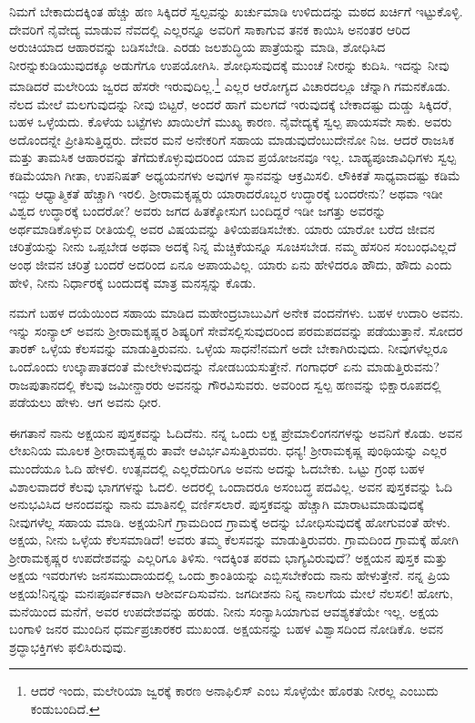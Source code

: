 ನಿಮಗೆ ಬೇಕಾದುದಕ್ಕಿಂತ ಹೆಚ್ಚು ಹಣ ಸಿಕ್ಕಿದರೆ ಸ್ವಲ್ಪವನ್ನು ಖರ್ಚುಮಾಡಿ ಉಳಿದುದನ್ನು ಮಠದ ಖರ್ಚಿಗೆ ಇಟ್ಟುಕೊಳ್ಳಿ. ದೇವರಿಗೆ ನೈವೇದ್ಯ ಮಾಡುವ ನೆವದಲ್ಲಿ ಎಲ್ಲರನ್ನೂ ಅವರಿಗೆ ಸಾಕಾಗುವ ತನಕ ಕಾಯಿಸಿ ಅನಂತರ ಆರಿದ ಅರುಚಿಯಾದ ಆಹಾರವನ್ನು ಬಡಿಸಬೇಡಿ. ಎರಡು ಜಲಶುದ್ಧಿಯ ಪಾತ್ರೆಯನ್ನು ಮಾಡಿ, ಶೋಧಿಸಿದ ನೀರನ್ನು\break ಕುಡಿಯುವುದಕ್ಕೂ ಅಡುಗೆಗೂ ಉಪಯೋಗಿಸಿ. ಶೋಧಿಸುವುದಕ್ಕೆ ಮುಂಚೆ ನೀರನ್ನು ಕುದಿಸಿ. ಇದನ್ನು ನೀವು ಮಾಡಿದರೆ ಮಲೇರಿಯ ಜ್ವರದ ಹೆಸರೇ ಇರುವುದಿಲ್ಲ.\footnote{ಆದರೆ ಇಂದು, ಮಲೇರಿಯಾ ಜ್ವರಕ್ಕೆ ಕಾರಣ ಅನಾಫಿಲಿಸ್ ಎಂಬ ಸೊಳ್ಳೆಯೇ ಹೊರತು ನೀರಲ್ಲ ಎಂಬುದು ಕಂಡುಬಂದಿದೆ.} ಎಲ್ಲರ ಆರೋಗ್ಯದ ವಿಚಾರದಲ್ಲೂ ಚೆನ್ನಾಗಿ ಗಮನಕೊಡು. ನೆಲದ ಮೇಲೆ ಮಲಗುವುದನ್ನು ನೀವು ಬಿಟ್ಟರೆ, ಅಂದರೆ ಹಾಗೆ ಮಲಗದೆ ಇರುವುದಕ್ಕೆ ಬೇಕಾದಷ್ಟು ದುಡ್ಡು ಸಿಕ್ಕಿದರೆ, ಬಹಳ ಒಳ್ಳೆಯದು. ಕೊಳೆಯ ಬಟ್ಟೆಗಳು ಖಾಯಿಲೆಗೆ ಮುಖ್ಯ ಕಾರಣ. ನೈವೇದ್ಯಕ್ಕೆ ಸ್ವಲ್ಪ ಪಾಯಸವೇ ಸಾಕು. ಅವರು ಅದೊಂದನ್ನೇ ಪ್ರೀತಿಸುತ್ತಿದ್ದರು. ದೇವರ ಮನೆ ಅನೇಕರಿಗೆ ಸಹಾಯ ಮಾಡುವುದೆಂಬುದೇನೋ ನಿಜ. ಆದರೆ ರಾಜಸಿಕ ಮತ್ತು ತಾಮಸಿಕ ಆಹಾರವನ್ನು ತೆಗೆದುಕೊಳ್ಳುವುದರಿಂದ ಯಾವ ಪ್ರಯೋಜನವೂ ಇಲ್ಲ. ಬಾಹ್ಯಪೂಜಾವಿಧಿಗಳು ಸ್ವಲ್ಪ ಕಡಿಮೆಯಾಗಿ ಗೀತಾ, ಉಪನಿಷತ್ ಅಧ್ಯಯನಗಳು ಅವುಗಳ ಸ್ಥಾನವನ್ನು ಆಕ್ರಮಿಸಲಿ. ಲೌಕಿಕತೆ ಸಾಧ್ಯವಾದಷ್ಟು ಕಡಿಮೆ ಇದ್ದು ಆಧ್ಯಾತ್ಮಿಕತೆ ಹೆಚ್ಚಾಗಿ ಇರಲಿ. ಶ‍್ರೀರಾಮಕೃಷ್ಣರು ಯಾರಾದರೊಬ್ಬರ ಉದ್ಧಾರಕ್ಕೆ ಬಂದರೇನು? ಅಥವಾ ಇಡೀ ವಿಶ್ವದ ಉದ್ಧಾರಕ್ಕೆ ಬಂದರೋ? ಅವರು ಜಗದ ಹಿತಕ್ಕೋಸುಗ ಬಂದಿದ್ದರೆ ಇಡೀ ಜಗತ್ತು ಅವರನ್ನು ಅರ್ಥಮಾಡಿಕೊಳ್ಳುವ ರೀತಿಯಲ್ಲಿ ಅವರ ವಿಷಯವನ್ನು ತಿಳಿಯಪಡಿಸಬೇಕು. ಯಾರು ಯಾರೋ ಬರೆದ ಜೀವನ ಚರಿತ್ರೆಯನ್ನು ನೀನು ಒಪ್ಪಬೇಡ ಅಥವಾ ಅದಕ್ಕೆ ನಿನ್ನ ಮೆಚ್ಚಿಕೆಯನ್ನೂ ಸೂಚಿಸಬೇಡ. ನಮ್ಮ ಹೆಸರಿನ ಸಂಬಂಧವಿಲ್ಲದೆ ಅಂಥ ಜೀವನ ಚರಿತ್ರೆ ಬಂದರೆ ಅದರಿಂದ ಏನೂ ಅಪಾಯವಿಲ್ಲ. ಯಾರು ಏನು ಹೇಳಿದರೂ ಹೌದು, ಹೌದು ಎಂದು ಹೇಳಿ, ನೀನು ನಿರ್ಧಾರಕ್ಕೆ ಬಂದುದಕ್ಕೆ ಮಾತ್ರ ಮನಸ್ಸನ್ನು ಕೊಡು.

ನಮಗೆ ಬಹಳ ದಯೆಯಿಂದ ಸಹಾಯ ಮಾಡಿದ ಮಹೇಂದ್ರಬಾಬುವಿಗೆ ಅನೇಕ ವಂದನೆಗಳು. ಬಹಳ ಉದಾರಿ ಅವನು. ಇನ್ನು ಸಂನ್ಯಾಲ್\enginline{-} ಅವನು ಶ‍್ರೀರಾಮಕೃಷ್ಣರ ಶಿಷ್ಯರಿಗೆ ಸೇವೆಸಲ್ಲಿಸುವುದರಿಂದ ಪರಮಪದವನ್ನು ಪಡೆಯುತ್ತಾನೆ. ಸೋದರ ತಾರಕ್ ಒಳ್ಳೆಯ ಕೆಲಸವನ್ನು ಮಾಡುತ್ತಿರುವನು. ಒಳ್ಳೆಯ ಸಾಧನೆ!ನಮಗೆ ಅದೇ ಬೇಕಾಗಿರುವುದು. ನೀವುಗಳೆಲ್ಲರೂ ಒಂದೊಂದು ಉಲ್ಕಾಪಾತದಂತೆ ಮೇಲೇಳುವುದನ್ನು ನೋಡಬಯಸುತ್ತೇನೆ. ಗಂಗಾಧರ್ ಏನು ಮಾಡುತ್ತಿರುವನು? ರಾಜಪುತಾನದಲ್ಲಿ ಕೆಲವು ಜಮೀನ್ದಾರರು ಅವನನ್ನು ಗೌರವಿಸುವರು. ಅವರಿಂದ ಸ್ವಲ್ಪ ಹಣವನ್ನು ಭಿಕ್ಷಾರೂಪದಲ್ಲಿ ಪಡೆಯಲು ಹೇಳು. ಆಗ ಅವನು ಧೀರ.

ಈಗತಾನೆ ನಾನು ಅಕ್ಷಯನ ಪುಸ್ತಕವನ್ನು ಓದಿದೆನು. ನನ್ನ ಒಂದು ಲಕ್ಷ ಪ್ರೇಮಾಲಿಂಗನಗಳನ್ನು ಅವನಿಗೆ ಕೊಡು. ಅವನ ಲೇಖನಿಯ ಮೂಲಕ ಶ‍್ರೀರಾಮಕೃಷ್ಣರು ತಾವೇ ಆವಿರ್ಭವಿಸುತ್ತಿರುವರು. ಧನ್ಯ! ಶ‍್ರೀರಾಮಕೃಷ್ಣ ಪುಂಥಿಯನ್ನು ಎಲ್ಲರ ಮುಂದೆಯೂ ಓದಿ ಹೇಳಲಿ. ಉತ್ಸವದಲ್ಲಿ ಎಲ್ಲರೆದುರಿಗೂ ಅವನು ಅದನ್ನು ಓದಬೇಕು. ಒಟ್ಟು ಗ್ರಂಥ ಬಹಳ ವಿಶಾಲವಾದರೆ ಕೆಲವು ಭಾಗಗಳನ್ನು ಓದಲಿ. ಅದರಲ್ಲಿ ಒಂದಾದರೂ ಅಸಂಬದ್ಧ ಪದವಿಲ್ಲ. ಅವನ ಪುಸ್ತಕವನ್ನು ಓದಿ ಅನುಭವಿಸಿದ ಆನಂದವನ್ನು ನಾನು ಮಾತಿನಲ್ಲಿ ವರ್ಣಿಸಲಾರೆ. ಪುಸ್ತಕವನ್ನು ಹೆಚ್ಚಾಗಿ ಮಾರಾಟಮಾಡುವುದಕ್ಕೆ ನೀವುಗಳೆಲ್ಲ ಸಹಾಯ ಮಾಡಿ. ಅಕ್ಷಯನಿಗೆ ಗ್ರಾಮದಿಂದ ಗ್ರಾಮಕ್ಕೆ ಅದನ್ನು ಬೋಧಿಸುವುದಕ್ಕೆ ಹೋಗುವಂತೆ ಹೇಳು. ಅಕ್ಷಯ, ನೀನು ಒಳ್ಳೆಯ ಕೆಲಸಮಾಡಿದೆ! \enginline{-} ಅವರು ತಮ್ಮ ಕೆಲಸವನ್ನು ಮಾಡುತ್ತಿರುವರು. ಗ್ರಾಮದಿಂದ ಗ್ರಾಮಕ್ಕೆ ಹೋಗಿ ಶ‍್ರೀರಾಮಕೃಷ್ಣರ ಉಪದೇಶವನ್ನು ಎಲ್ಲರಿಗೂ ತಿಳಿಸು. ಇದಕ್ಕಿಂತ ಪರಮ ಭಾಗ್ಯವಿರುವುದೆ? ಅಕ್ಷಯನ ಪುಸ್ತಕ ಮತ್ತು ಅಕ್ಷಯ ಇವರುಗಳು ಜನಸಮುದಾಯದಲ್ಲಿ ಒಂದು ಕ್ರಾಂತಿಯನ್ನು ಎಬ್ಬಿಸಬೇಕೆಂದು ನಾನು ಹೇಳುತ್ತೇನೆ. ನನ್ನ ಪ್ರಿಯ ಅಕ್ಷಯ!ನಿನ್ನನ್ನು ಮನಃಪೂರ್ವಕವಾಗಿ ಆಶೀರ್ವದಿಸುವೆನು. ಜಗದೀಶನು ನಿನ್ನ ನಾಲಗೆಯ ಮೇಲೆ ನೆಲಸಲಿ! ಹೋಗು, ಮನೆಯಿಂದ ಮನೆಗೆ, ಅವರ ಉಪದೇಶವನ್ನು ಹರಡು. ನೀನು ಸಂನ್ಯಾಸಿಯಾಗುವ ಆವಶ್ಯಕತೆಯೇ ಇಲ್ಲ. ಅಕ್ಷಯ ಬಂಗಾಳಿ ಜನರ ಮುಂದಿನ ಧರ್ಮಪ್ರಚಾರಕರ ಮುಖಂಡ. ಅಕ್ಷಯನನ್ನು ಬಹಳ ವಿಶ್ವಾಸದಿಂದ ನೋಡಿಕೊ. ಅವನ ಶ್ರದ್ಧಾಭಕ್ತಿಗಳು ಫಲಿಸಿರುವುವು.

